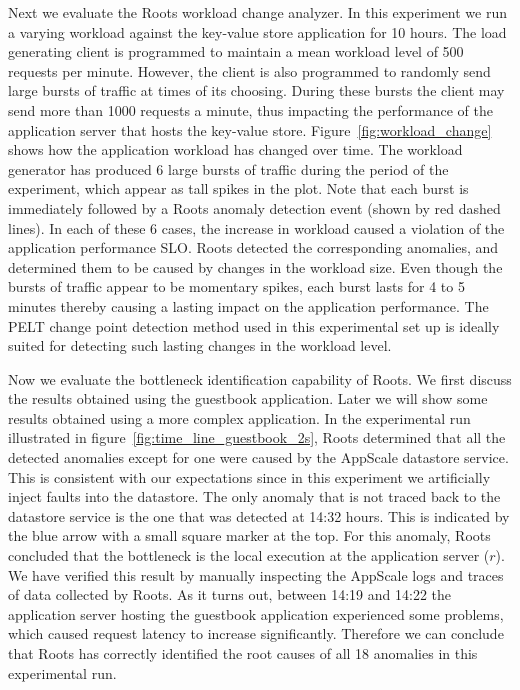 Next we evaluate the Roots workload change analyzer. In this experiment we run a varying workload
against the key-value store application for 10 hours. The load generating client is programmed
to maintain a mean workload level of 500 requests per minute. However, the client
is also programmed to randomly send large bursts of traffic at times of its choosing. During these bursts 
the client may send more than 1000 requests a minute, thus impacting the performance of
the application server that hosts the key-value store. Figure~\ref{fig:workload_change} shows how
the application workload has changed over time. The workload generator has produced 6 large bursts of traffic during the 
period of the experiment, which appear as tall spikes in the plot.
Note that each burst is immediately followed by a Roots anomaly detection event (shown by red dashed lines). 
In each of these 6 cases, the increase in workload caused a violation of the application performance SLO.
Roots detected the corresponding anomalies, and determined them to be caused by changes in the workload size.
Even though the bursts of traffic appear to be momentary
spikes, each burst lasts for 4 to 5 minutes thereby causing a lasting impact on the application performance.
The PELT change point detection method used in this experimental set up is ideally suited for detecting
such lasting changes in the workload level.

Now we evaluate the bottleneck identification capability of Roots. We first discuss the results obtained using
the guestbook application. Later we will show some results obtained using a more complex application.
In the experimental run illustrated in 
figure~\ref{fig:time_line_guestbook_2s}, Roots determined that all the detected anomalies except for one were 
caused by the AppScale datastore service. This is consistent with our expectations since in this experiment we 
artificially inject faults into the datastore.
The only anomaly that is not traced back to the datastore service is the one that was detected at 14:32 hours.
This is indicated by the blue arrow with a small square marker at the top. For this anomaly, Roots concluded that
the bottleneck is the local execution at the application server ($r$). We have verified
this result by manually inspecting the AppScale logs and traces of data collected by Roots. As it turns out,
between 14:19 and
14:22 the application server hosting the guestbook application experienced some problems, which caused
request latency to increase significantly. Therefore we can conclude that Roots has correctly identified 
the root causes of all 18 anomalies in this experimental run.

